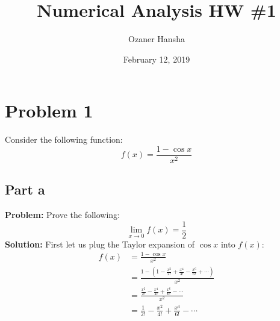 \documentclass{article}
\begin{document}
\title{Numerical Analysis HW \#1}
\author{Ozaner Hansha}
\date{February 12, 2019}
\maketitle

\section*{Problem 1}
Consider the following function:
$$f(x)=\frac{1-\cos x}{x^2}$$

\subsection*{Part a}
\textbf{Problem:} Prove the following:
$$\lim_{x\to0} f(x)=\frac{1}{2}$$
\textbf{Solution:}
First let us plug the Taylor expansion of $\cos x$ into $f(x)$:
\begin{align*}
f(x)&=\frac{1-\cos x}{x^2}\\
&=\frac{1-(1-\frac{x^2}{2!}+\frac{x^4}{4!}-\frac{x^6}{6!}+\cdots)}{x^2}\\
&=\frac{\frac{x^2}{2!}-\frac{x^4}{4!}+\frac{x^6}{6!}-\cdots}{x^2}\\
&=\frac{1}{2!}-\frac{x^2}{4!}+\frac{x^4}{6!}-\cdots\\
\end{align*}
\end{document}
